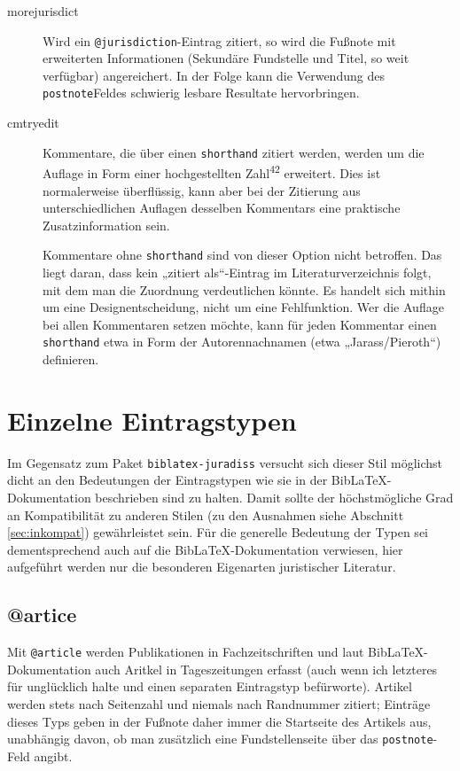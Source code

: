 \documentclass[11pt,a4paper,DIV=calc]{scrartcl}
\newcommand\software[1]{\textsf{#1}}
\newcommand\Biblatex{\software{Bib\LaTeX{}}\xspace}
\begin{document}
\begin{description}
\item[morejurisdict] Wird ein \verb+@jurisdiction+-Eintrag zitiert, so
  wird die Fußnote mit erweiterten Informationen (Sekundäre Fundstelle
  und Titel, so weit verfügbar) angereichert. In der Folge kann die
  Verwendung des \verb+postnote+Feldes schwierig lesbare Resultate
  hervorbringen.
\item[cmtryedit] Kommentare, die über einen \verb+shorthand+ zitiert
  werden, werden um die Auflage in Form einer hochgestellten
  Zahl\textsuperscript{42} erweitert. Dies ist normalerweise
  überflüssig, kann aber bei der Zitierung aus unterschiedlichen
  Auflagen desselben Kommentars eine praktische Zusatzinformation
  sein.

  Kommentare ohne \verb+shorthand+ sind von dieser Option nicht
  betroffen. Das liegt daran, dass kein „zitiert als“-Eintrag im
  Literaturverzeichnis folgt, mit dem man die Zuordnung verdeutlichen
  könnte. Es handelt sich mithin um eine Designentscheidung, nicht um
  eine Fehlfunktion. Wer die Auflage bei allen Kommentaren setzen
  möchte, kann für jeden Kommentar einen \verb+shorthand+ etwa in Form
  der Autorennachnamen (etwa „Jarass/Pieroth“) definieren.
\end{description}

\section{Einzelne Eintragstypen}

Im Gegensatz zum Paket \verb+biblatex-juradiss+ versucht sich dieser
Stil möglichst dicht an den Bedeutungen der Eintragstypen wie sie in
der \Biblatex-Do\-ku\-men\-ta\-tion beschrieben sind zu halten. Damit sollte
der höchstmögliche Grad an Kompatibilität zu anderen Stilen (zu den
Ausnahmen siehe Abschnitt \ref{sec:inkompat}) gewährleistet sein. Für
die generelle Bedeutung der Typen sei dementsprechend auch auf die
\Biblatex-Do\-ku\-men\-ta\-tion verwiesen, hier aufgeführt werden nur die
besonderen Eigenarten juristischer Literatur.

\subsection{@artice}

Mit \verb+@article+ werden Publikationen in Fachzeitschriften und laut
\Biblatex-Do\-ku\-men\-ta\-tion auch Aritkel in Tageszeitungen erfasst (auch
wenn ich letzteres für unglücklich halte und einen separaten
Eintragstyp befürworte). Artikel werden stets nach Seitenzahl und
niemals nach Randnummer zitiert; Einträge dieses Typs geben in der
Fußnote daher immer die Startseite des Artikels aus, unabhängig davon,
ob man zusätzlich eine Fundstellenseite über das \verb+postnote+-Feld
angibt.
\end{document}
